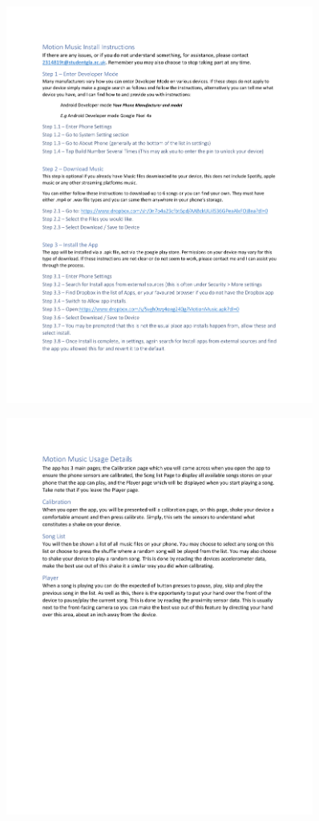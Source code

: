 \documentclass{l4proj}
\begin{document}
\begin{appendices}
\begin{figure}[!htb]
    \includegraphics[width=0.9\textwidth]{images/2Info.pdf}
\end{figure}
\begin{figure}[!htb]
    \centering
    \includegraphics[width=0.9\textwidth]{images/3Info.pdf}
\end{figure}


\end{appendices}
\end{document}

